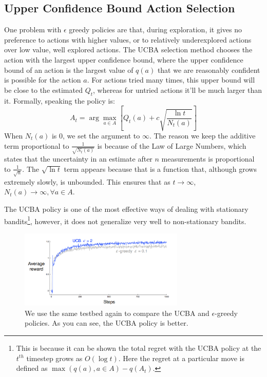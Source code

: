 \documentclass[12pt]{report}
\begin{document}
\subsection{Upper Confidence Bound Action Selection}
One problem with $\epsilon$ greedy policies are that, during exploration, it gives no preference to actions with higher values, or to relatively underexplored actions over low value, well explored actions.
The UCBA selection method chooses the action with the largest upper confidence bound, where the upper confidence bound of an action is the largest value of $q(a)$ that we are reasonably confident is possible for the action $a$.
For actions tried many times, this upper bound will be close to the estimated $Q_{t}$, whereas for untried actions it'll be much larger than it. Formally, speaking the policy is:
\begin{equation}
    A_{t} = \arg\max_{a \in A}\left[Q_{t}(a) + c\sqrt{\frac{\ln t}{N_{t}(a)}}\right]
\end{equation}
When $N_{t}(a)$ is $0$, we set the argument to $\infty$. The reason we keep the additive term proportional to $\frac{1}{\sqrt{N_{t}(a)}}$ is because of the Law of Large Numbers, 
which states that the uncertainty in an estimate after $n$ measurements is proportional to $\frac{1}{\sqrt{n}}$. The $\sqrt{\ln t}$ term appears because that is a function that, although grows extremely slowly,
is unbounded. This ensures that as $t \rightarrow \infty$, $N_{t}(a) \rightarrow \infty, \forall a \in A$. 

The UCBA policy is one of the most effective ways of dealing with stationary bandits\footnote{This is because it can be shown the total regret with the UCBA policy at the $t^{th}$ timestep grows as $O(\log t)$. Here the regret at a particular move is defined as $\max(q(a), a \in A) - q(A_{t})$.}, however, it does not generalize very well
to non-stationary bandits. 
\begin{figure}[h!]
    \centering
    \includegraphics[width=0.7\textwidth]{images/UCBA.png}
    \caption{We use the same testbed again to compare the UCBA and $\epsilon$-greedy policies. As you can see, the UCBA policy is better.}
\end{figure}
\end{document}
